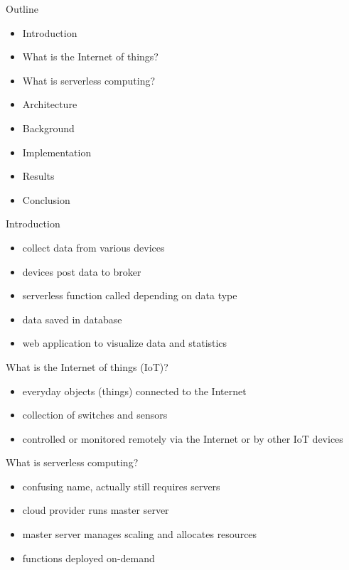 \documentclass[aspectratio=169]{beamer}
\begin{document}
  \maketitle

  \begin{frame}{Outline}
    \begin{itemize}
      \item Introduction
      \item What is the Internet of things?
      \item What is serverless computing?
      \item Architecture
      \item Background
      \item Implementation
      \item Results
      \item Conclusion
    \end{itemize}
  \end{frame}

  \begin{frame}{Introduction}
    \begin{itemize}
      \item collect data from various devices
      \item devices post data to broker
      \item serverless function called depending on data type
      \item data saved in database
      \item web application to visualize data and statistics
    \end{itemize}
  \end{frame}

  \begin{frame}{What is the Internet of things (IoT)?}
    \begin{itemize}
      \item everyday objects (things) connected to the Internet
      \item collection of switches and sensors
      \item controlled or monitored remotely via the Internet or by other IoT devices
    \end{itemize}
  \end{frame}

  \begin{frame}{What is serverless computing?}
    \begin{itemize}
      \item confusing name, actually still requires servers
      \item cloud provider runs master server
      \item master server manages scaling and allocates resources
      \item functions deployed on-demand
    \end{itemize}
  \end{frame}
\end{document}

